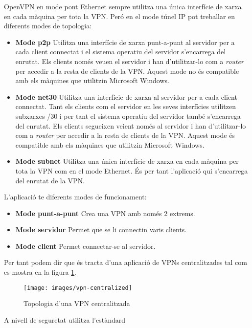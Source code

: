 OpenVPN en mode pont Ethernet sempre utilitza una única interfície de xarxa en cada màquina per tota la VPN. Peró en el mode túnel IP pot treballar en diferents modes de topologia:
\begin{itemize}
\item \textbf{Mode p2p} Utilitza una interfície de xarxa punt-a-punt al servidor per a cada client connectat i el sistema operatiu del servidor s'encarrega del enrutat. Els clients només veuen el servidor i han d'utilitzar-lo com a \emph{router} per accedir a la resta de clients de la VPN. Aquest mode no és compatible amb els màquines que utilitzin Microsoft Windows.
\item \textbf{Mode net30} Utilitza una interfície de xarxa al servidor per a cada client connectat. Tant els clients com el servidor en les seves interfícies utilitzen subxarxes /30 i per tant el sistema operatiu del servidor també s'encarrega del enrutat. Els clients segueixen veient només al servidor i han d'utilitzar-lo com a \emph{router} per accedir a la resta de clients de la VPN. Aquest mode és compatible amb els màquines que utilitzin Microsoft Windows.
\item \textbf{Mode subnet} Utilitza una única interfície de xarxa en cada màquina per tota la VPN com en el mode Ethernet. És per tant l'aplicació qui s'encarrega del enrutat de la VPN.
\end{itemize}

L'aplicació te diferents modes de funcionament:
\begin{itemize}
\item \textbf{Mode punt-a-punt} Crea una VPN amb només 2 extrems.
\item \textbf{Mode servidor} Permet que se li connectin varis clients.
\item \textbf{Mode client} Permet connectar-se al servidor.
\end{itemize}
Per tant podem dir que és tracta d'una aplicació de VPNs centralitzades tal com es mostra en la figura \ref{F:vpn-centralized}.
\begin{figure}[htb]
\centering
\texttt{[image: images/vpn-centralized]}
\caption{Topologia d'una VPN centralitzada}
\label{F:vpn-centralized}
\end{figure}

A nivell de seguretat utilitza l'estàndard 

\clearpage%
